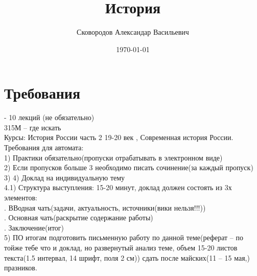 \documentclass[a4paper, 12pt]{article}
\title{История}
\author{Сковородов Александар Васильевич}
\date{\today}
\begin{document}
\sffamily
\maketitle
\section*{Требования}
- 10 лекций (не обязательно)\\
315М -- где искать\\
Курсы: История России часть 2 19-20 век , Современная история России.
Требования для автомата:\\
1) Практики обязательно(пропуски отрабатывать в электронном виде)\\
2) Если пропусков больше 3 необходимо писать сочинение(за каждый пропуск)\\
3)
4) Доклад на индивидуальную тему\\
4.1) Структура выступления: 15-20 минут, доклад должен состоять из 3х элементов:\\
. ВВодная чать(задачи, актуальность, источники(вики нельзя!!!))\\
. Основная чать(раскрытие содержание работы)\\
. Заключение(итог)\\
5) ПО итогам подготовить письменную работу по данной теме(реферат -- по тойже тебе что и доклад, но развернутый анализ теме, объем 15-20 листов текста(1.5 интервал, 14 шрифт, поля 2 см)) сдать после майских(11 -- 15 мая,) празников.\\

\newpage
\end{document}
